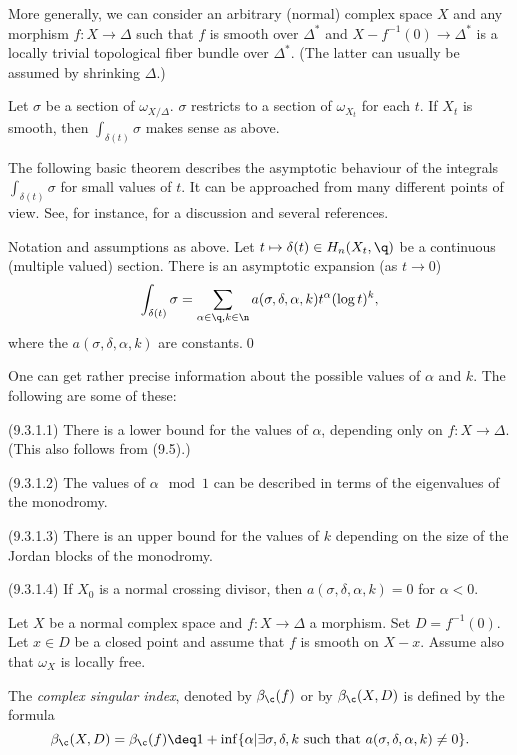  More generally, we can consider an arbitrary (normal)
complex space $X$ and  any morphism 
$f:X\to\Delta$ such that $f$ is smooth over $\Delta^*$ and $X-f^{-1}(0)\to
\Delta^*$ is a locally trivial topological fiber bundle over $\Delta^*$. (The
latter can usually be assumed by shrinking $\Delta$.)

Let $\sigma $ be a section of $\omega_{X/\Delta}$.  $\sigma$ restricts to a
section of $\omega_{X_t}$ for each $t$. If $X_t$ is smooth,  then 
$\int_{\delta(t)} \sigma$ makes sense as above.
\enddemo

The following basic theorem describes the asymptotic behaviour of the
integrals $\int_{\delta(t)} \sigma$ for small values of $t$.  It can be
approached from many different points of view. See,  for instance,
\cite{AGV85, II.10.2} for a discussion and several references.

   Notation and assumptions
as above.  Let $t\mapsto \delta(t)\in H_n(X_t,\q)$ be a continuous (multiple
valued) section. 
There is an asymptotic
expansion (as $t\to 0$)
$$
\int_{\delta(t)} \sigma =
\sum_{\alpha\in\q, k\in\n} a(\sigma, \delta, \alpha, k) t^{\alpha} (\log t)^k,
$$
where the $a(\sigma, \delta, \alpha, k)$ are constants.\qed
\endproclaim

 One can get rather precise information about the
possible values of $\alpha$ and $k$. The following are some of these:



(9.3.1.1) There is  a lower bound for the values of $\alpha$, depending only
on
$f:X\to\Delta$. (This also follows from (9.5).)

(9.3.1.2) The values of $\alpha \mod 1$ can be described in terms of the
eigenvalues of the monodromy.

(9.3.1.3)  There is an upper bound for the values of $k$ depending on the size
of the Jordan blocks of the monodromy.

(9.3.1.4) If  $X_0$ is a normal crossing divisor, then 
$a(\sigma, \delta, \alpha, k)=0$ for $\alpha< 0$.
\endproclaim

    Let $X$ be a normal complex space and $f:X\to\Delta$
 a morphism. Set $D=f^{-1}(0)$.  Let $x\in D$ be a closed point and
assume that 
$f$ is smooth on $X-x$. Assume also that $\omega_X$ is locally  free.



The {\it complex singular index}, denoted by  $\beta_{\c}(f)$ or by
$\beta_{\c}(X,D)$ is defined by the formula
$$
\beta_{\c}(X,D)=
\beta_{\c}(f)\deq 1+\inf\{\alpha\vert \exists \sigma, \delta, k \text{ such
that } a(\sigma, \delta, \alpha, k)\neq 0\}.
$$

